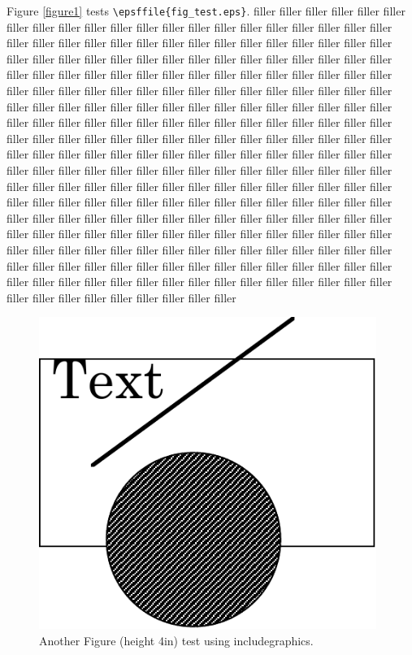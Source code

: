 \documentclass{article}
\begin{document}
Figure \ref{figure1} tests \verb#\epsffile{fig_test.eps}#.
filler filler filler filler filler filler filler filler filler
filler filler filler filler filler filler filler filler filler
filler filler filler filler filler filler filler filler filler
filler filler filler filler filler filler filler filler filler
filler filler filler filler filler filler filler filler filler
filler filler filler filler filler filler filler filler filler
filler filler filler filler filler filler filler filler filler
filler filler filler filler filler filler filler filler filler
filler filler filler filler filler filler filler filler filler
filler filler filler filler filler filler filler filler filler
filler filler filler filler filler filler filler filler filler
filler filler filler filler filler filler filler filler filler
filler filler filler filler filler filler filler filler filler
filler filler filler filler filler filler filler filler filler
filler filler filler filler filler filler filler filler filler
filler filler filler filler filler filler filler filler filler
filler filler filler filler filler filler filler filler filler
filler filler filler filler filler filler filler filler filler
filler filler filler filler filler filler filler filler filler
filler filler filler filler filler filler filler filler filler
filler filler filler filler filler filler filler filler filler
filler filler filler filler filler filler filler filler filler
filler filler filler filler filler filler filler filler filler
filler filler filler filler filler filler filler filler filler
filler filler filler filler filler filler filler filler filler
filler filler filler filler filler filler filler filler filler
filler filler filler filler filler filler filler filler filler
filler filler filler filler filler filler filler filler filler
filler filler filler filler filler filler filler filler filler
filler filler filler filler filler filler filler filler filler

\begin{figure}
\includegraphics[height=4in]{fig_testb}
\caption{Another Figure (height 4in) test using includegraphics.} 
\label{figure2}
\end{figure}
\end{document}
